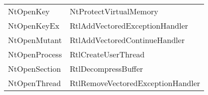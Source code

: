 \begin{tabular}[t]{|l|l|}
NtOpenKey                        &NtProtectVirtualMemory           \\
NtOpenKeyEx                      &RtlAddVectoredExceptionHandler   \\
NtOpenMutant                     &RtlAddVectoredContinueHandler    \\
NtOpenProcess                    &RtlCreateUserThread              \\
NtOpenSection                    &RtlDecompressBuffer              \\
NtOpenThread                     &RtlRemoveVectoredExceptionHandler\\
\hline
\end{tabular}